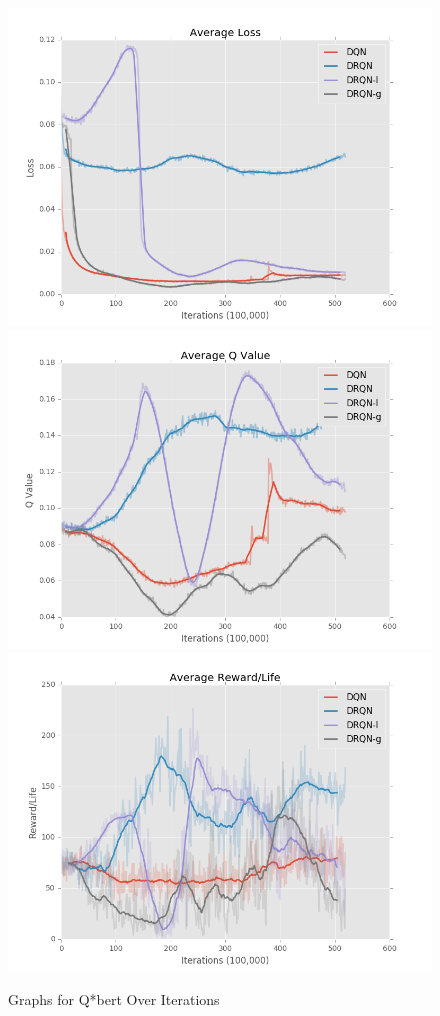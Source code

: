 \documentclass{article}
\begin{document}
\begin{figure}[h]
    \centering
    \begin{minipage}{1.0\textwidth}
        \centering
        \includegraphics[scale=0.2]{avg_loss}
        \centering
        \includegraphics[scale=0.2]{avg_q}
        \centering
        \includegraphics[scale=0.2]{avg_reward}
    \end{minipage}
    \caption{Graphs for Q*bert Over Iterations}
\end{figure}
\end{document}
